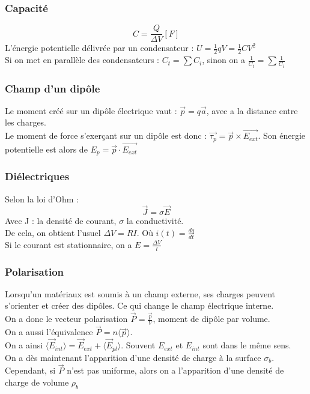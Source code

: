 \documentclass[../main.tex]{subfiles}
\begin{document}
\subsubsection{Capacité}
\begin{equation}
    C = \frac{Q}{\Delta V} [F]
\end{equation}
L'énergie potentielle délivrée par un condensateur : $U = \frac{1}{2}qV = \frac{1}{2}CV^2$\\
Si on met en parallèle des condensateurs : $C_t = \sum C_i$, sinon on a $\frac{1}{C_t} = \sum \frac{1}{C_i}$\\

\subsubsection{Champ d'un dipôle}
Le moment créé sur un dipôle électrique vaut : $\vec{p} = q\vec{a}$, avec a la distance entre les charges.\\

Le moment de force s'exerçant sur un dipôle est donc : $\vec{\tau_p} = \vec{p} \times \vec{E_{ext}}$. Son énergie potentielle est alors de $E_p = \vec{p} \cdot \vec{E_{ext}}$\\

\subsubsection{Diélectriques}
Selon la loi d'Ohm :\\
\begin{equation}
    \vec{J} = \sigma \vec{E}
\end{equation}
Avec J : la densité de courant, $\sigma$ la conductivité.\\
De cela, on obtient l'usuel $\Delta V = RI$. Où $i(t) = \frac{dq}{dt}$\\
Si le courant est stationnaire, on a $E = \frac{\Delta V}{l}$\\

\subsubsection{Polarisation}
Lorsqu'un matériaux est soumis à un champ externe, ses charges peuvent s'orienter et créer des dipôles. Ce qui change le champ électrique interne.\\
On a donc le vecteur polarisation $\vec{P} = \frac{\vec{p}}{V}$, moment de dipôle par volume.\\
On a aussi l'équivalence $\vec{P} = n \langle \vec{p}\rangle$. \\
On a ainsi $\langle \vec{E}_{int} \rangle= \vec{E}_{ext} + \langle \vec{E}_{pl}\rangle$. Souvent $E_{ext}$ et $E_{int}$ sont dans le même sens. \\
On a dès maintenant l'apparition d'une densité de charge à la surface $\sigma_b$. Cependant, si $\vec{P}$ n'est pas uniforme, alors on a l'apparition d'une densité de charge de volume $\rho_b$\\
\end{document}
